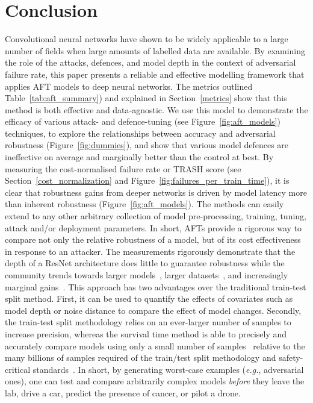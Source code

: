 \section{Conclusion}
Convolutional neural networks have shown to be widely applicable to a large number of fields when large amounts of labelled data are available.
By examining the role of the attacks, defences, and model depth in the context of adversarial failure rate, this paper presents a reliable and effective modelling framework that applies AFT models to deep neural networks.
The metrics outlined Table~\ref{tab:aft_summary}) and explained in Section~\ref{metrics} show that this method is both effective and data-agnostic.  We use this model to demonstrate the efficacy of various attack- and defence-tuning (see Figure~\ref{fig:aft_models}) techniques, to  explore the relationships between accuracy and adversarial robustness (Figure~\ref{fig:dummies}), and show that various model defences are ineffective on average and marginally better than the control at best.
By measuring the cost-normalised failure rate or TRASH score (see Section~\ref{cost_normalization} and Figure~\ref{fig:failures_per_train_time}), it is clear that robustness gains from deeper networks is driven by model latency more than inherent robustness (Figure~\ref{fig:aft_models}).
The methods can easily extend to any other arbitrary collection of model pre-processing, training, tuning, attack and/or deployment parameters. In short, AFTs provide a rigorous way to compare not only the relative robustness of a model, but of its cost effectiveness in response to an attacker.
The measurements rigorously demonstrate  that the depth of a ResNet architecture does little to guarantee robustness while the community trends towards larger models~\cite{desislavov2021compute}, larger datasets~\cite{desislavov2021compute,bailly2022effects}, and increasingly marginal gains~\cite{sun2017revisiting}. This approach has two advantages over the traditional train-test split method.
First, it can be used to quantify the effects of covariates such as model depth or noise distance to compare the effect of model changes. Secondly, the train-test split methodology relies on an ever-larger number of samples to increase precision, whereas the survival time method is able to precisely and accurately compare models using only a small number of samples~\cite{schmoor2000sample,lachin1981introduction} relative to the many billions of samples required of the train/test split methodology and safety-critical standards~\cite{iso26262,IEC61508,IEC62034,meyers}.
In short, by generating worst-case examples (\textit{e.g.}, adversarial ones), one can test and compare arbitrarily complex models \textit{before} they leave the lab, drive a car, predict the presence of cancer, or pilot a drone.
